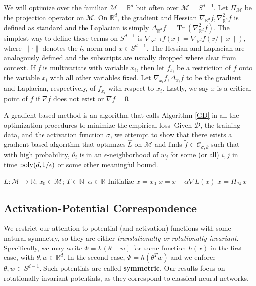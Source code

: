 \documentclass{article}
\newcommand{\N}{{\mathbb{N}}}
\newcommand{\R}{{\mathbb{R}}}
\DeclareMathOperator{\Tr}{Tr}
\begin{document}
We will optimize over the familiar $\mathcal{M}= \R^d$ but often over $\mathcal{M} = S^{d-1}$. Let $\Pi_\mathcal{M}$ be the projection operator on $\mathcal{M}$. On $\R^d$, the gradient and Hessian $\nabla_{\R^d} f, \nabla_{\R^d}^2 f$ is defined as standard and the Laplacian is simply $\Delta_{\R^d} f = \Tr(\nabla_{\R^d}^2 f)$. The simplest way to define these terms on $S^{d-1}$ is $\nabla_{S^{d-1}} f(x) = \nabla_{\R^d} f(x/\|x\|)$, where $\| \cdot \|$ denotes the $l_2$ norm and $x \in S^{d-1}$. The Hessian and Laplacian are analogously defined and the subscripts are usually dropped where clear from context. If $f$ is multivariate with variable $x_i$, then let $f_{x_i}$ be a
restriction of $f$ onto the variable $x_i$ with all other variables
fixed. Let $\nabla_{x_i}f, \Delta_{x_i}f$ to be the gradient and
Laplacian, respectively, of $f_{x_i}$ with respect to
$x_i$. Lastly, we say $x$ is a critical point of $f$ if $\nabla f$
does not exist or $\nabla f = 0$.

A gradient-based method is an algorithm that calls Algorithm \ref{GD}
in all the optimization procedures to minimize the empirical
loss. Given $\mathcal{D}$, the training data, and the activation
function $\sigma$, we attempt to show that there exists a gradient-based
algorithm that optimizes $\widehat{L}$ on $\mathcal{M}$ and finds
$\widetilde{f} \in \mathcal{C}_{\sigma, k}$ such that with high probability, $\theta_i$ is in an $\epsilon$-neighborhood of $w_j$ for some (or all) $i, j$ in time $\mathrm{poly}(d,1/\epsilon)$ or some
other meaningful bound.

\begin{algorithm}[hb]
 \caption{$x = GradientDescent(L,x_0, T,\alpha$)}
   \label{GD}
\begin{algorithmic}
    $L: \mathcal{M} \to \R$; $x_0 \in \mathcal{M}$; $T\in \N$; $\alpha\in \R$
   \STATE Initialize $x = x_0$
   \STATE $x = x - \alpha\nabla L(x)$
   \STATE $x = \Pi_\mathcal{M} x$
   \ENDFOR
\end{algorithmic}
\end{algorithm}

\subsection{Activation-Potential Correspondence}
We restrict our attention to potential (and activation) functions with some natural symmetry, so they are either {\it translationally or rotationally invariant}. Specifically, we may write $\Phi= h(\theta-w)$ for some function $h(x)$  in the first case, with $\theta, w \in \R^d$. In the second case, $\Phi = h(\theta^Tw)$ and we enforce $\theta, w \in S^{d-1}$. Such potentials are called {\bf symmetric}. Our results focus on rotationally invariant potentials, as they correspond to classical neural networks.
\end{document}
